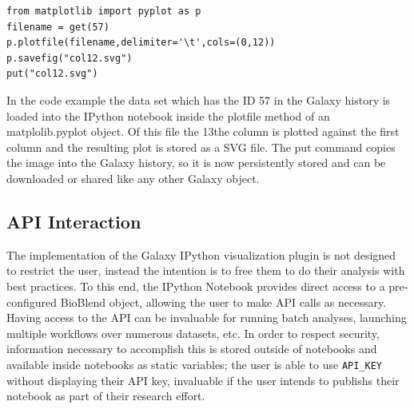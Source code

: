 \documentclass{bioinfo}
\begin{document}
\begin{methods}
\begin{lstlisting}[frame=single]
from matplotlib import pyplot as p
filename = get(57)
p.plotfile(filename,delimiter='\t',cols=(0,12))
p.savefig("col12.svg")
put("col12.svg")
\end{lstlisting}
In the code example the data set which has the ID 57 in the Galaxy history is loaded into the IPython notebook inside the plotfile method of an matplolib.pyplot object. Of this file the 13the column is plotted against the first column and the resulting plot is stored as a SVG file. The put command copies the image into the Galaxy history, so it is now persistently stored and can be downloaded or shared like any other Galaxy object.

\subsection{API Interaction}
The implementation of the Galaxy IPython visualization plugin is not designed to restrict the user, instead the intention is to free them to do their analysis with best practices. To this end, the IPython Notebook provides direct access to a pre-configured BioBlend object, allowing the user to make API calls as necessary. Having access to the API can be invaluable for running batch analyses, launching multiple workflows over numerous datasets, etc. In order to respect security, information necessary to accomplish this is stored outside of notebooks and available inside notebooks as static variables; the user is able to use \texttt{API_KEY} without displaying their API key, invaluable if the user intends to publishs their notebook as part of their research effort.

%
%
%
%
%
%
%
%
%
%



\end{methods}
\end{document}
